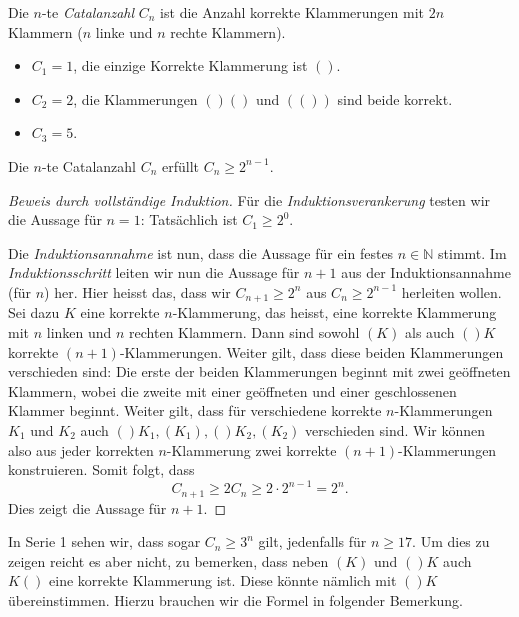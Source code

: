\documentclass[../main.tex]{subfiles}
\begin{document}
\begin{definition}
  Die $n$-te \emph{Catalanzahl} $C_{n}$ ist die Anzahl korrekte
  Klammerungen mit $2n$ Klammern ($n$ linke und $n$ rechte Klammern).
\end{definition}

\begin{examples}
  \leavevmode
  \begin{itemize}
    \item
        $C_{1} = 1$, die einzige Korrekte Klammerung ist $()$.
    \item
      $C_{2} = 2$, die Klammerungen $()()$ und $(())$ sind beide korrekt.
    \item $C_{3} = 5$.
  \end{itemize}
\end{examples}

\begin{claim}
  Die $n$-te Catalanzahl $C_{n}$ erfüllt $C_{n} \geq 2^{n-1}$.
\end{claim}

\begin{proof}[Beweis durch vollständige Induktion]
  Für die \emph{Induktionsverankerung} testen wir die Aussage für $n = 1$:
  Tatsächlich
  ist $C_{1} \geq 2^{0}$.

  Die \emph{Induktionsannahme} ist nun,
  dass die Aussage für ein festes $n \in \mathbb N$ stimmt.
  Im \emph{Induktionsschritt} leiten wir nun die Aussage für $n + 1$
  aus der Induktionsannahme (für $n$) her.
  Hier heisst das, dass wir $C_{n+1} \geq 2^{n}$ aus $C_{n} \geq 2^{n-1}$
  herleiten wollen. Sei dazu $K$ eine korrekte $n$-Klammerung,
  das heisst, eine korrekte
  Klammerung mit $n$ linken und $n$ rechten Klammern.
  Dann sind sowohl $(K)$ als auch $()K$ korrekte $(n+1)$-Klammerungen.
  Weiter gilt, dass diese beiden Klammerungen verschieden sind:
  Die erste der beiden Klammerungen beginnt mit zwei geöffneten Klammern,
  wobei die zweite mit einer geöffneten und einer geschlossenen
  Klammer beginnt.
  Weiter gilt, dass für verschiedene
  korrekte $n$-Klammerungen $K_{1}$ und $K_{2}$
  auch $()K_{1}, (K_{1}), ()K_{2}, (K_{2})$ verschieden sind.
  Wir können also aus jeder korrekten $n$-Klammerung zwei korrekte
  $(n+1)$-Klammerungen konstruieren. Somit folgt, dass
  \[C_{n+1} \geq 2 C_{n} \geq 2 \cdot 2^{n-1} = 2^{n}.\]
  Dies zeigt die Aussage für $n+ 1$.
\end{proof}

In Serie 1 sehen wir, dass sogar $C_{n} \geq 3^{n}$ gilt,
jedenfalls für $n \geq 17$.
Um dies zu zeigen reicht es aber nicht, zu bemerken,
dass neben $(K)$ und $()K$ auch $K()$ eine korrekte
Klammerung ist. Diese könnte nämlich mit $()K$
übereinstimmen.
Hierzu brauchen wir die Formel in folgender Bemerkung.
\end{document}
